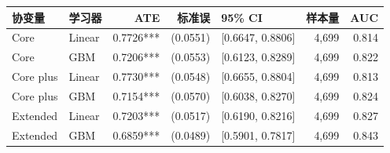 \begin{tabular}{llrrlrr}
\toprule
协变量 & 学习器 & ATE & 标准误 & 95\% CI & 样本量 & AUC \\
\midrule
Core & Linear & 0.7726*** & (0.0551) & [0.6647, 0.8806] & 4,699 & 0.814 \\
Core & GBM & 0.7206*** & (0.0553) & [0.6123, 0.8289] & 4,699 & 0.822 \\
Core plus & Linear & 0.7730*** & (0.0548) & [0.6655, 0.8804] & 4,699 & 0.813 \\
Core plus & GBM & 0.7154*** & (0.0570) & [0.6038, 0.8270] & 4,699 & 0.824 \\
Extended & Linear & 0.7203*** & (0.0517) & [0.6190, 0.8216] & 4,699 & 0.827 \\
Extended & GBM & 0.6859*** & (0.0489) & [0.5901, 0.7817] & 4,699 & 0.843 \\
\bottomrule
\end{tabular}
